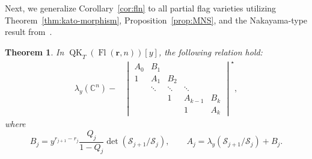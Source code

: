 \documentclass[pdftex]{sigma}
\numberwithin{equation}{section}
\newtheorem{Theorem}{Theorem}[section]
\theoremstyle{definition}
\DeclareMathOperator{\Fl}{Fl}
\DeclareMathOperator{\QK}{QK}
\newcommand{\bfr}{{\mathbf r}}
\newcommand{\C}{{\mathbb C}}
\newcommand{\cS}{{\mathcal S}}
\begin{document}
Next, we generalize Corollary~\ref{cor:fln} to all partial flag varieties utilizing Theorem~\ref{thm:kato-morphism}, Proposition~\ref{prop:MNS}, and the Nakayama-type result from~\cite{GMSXZZ:QKW, gu2022quantum}.

\begin{Theorem}\label{thm:whit-short}
 In $\QK_T(\Fl(\bfr,n))[y]$, the following relation hold:
 \begin{align}\label{eqn:whit-short}
 \lambda_y(\C^n)-
 &\begin{vmatrix}
 A_0 & B_1 & & & \\
 1 & A_1 & B_2 & & \\ & \ddots & \ddots & \ddots & \\ & & 1 & A_{k-1} & B_{k}\\ & & & 1 & A_{k}
 \end{vmatrix}^\star,
 \end{align}
 where \[
 B_j=y^{r_{j+1}-r_j}\frac{Q_j}{1-Q_j}\det(\cS_{j+1}/\cS_j),\qquad
 A_j=\lambda_y(\cS_{j+1}/\cS_j)+B_j.
\]
\end{Theorem}
\end{document}
